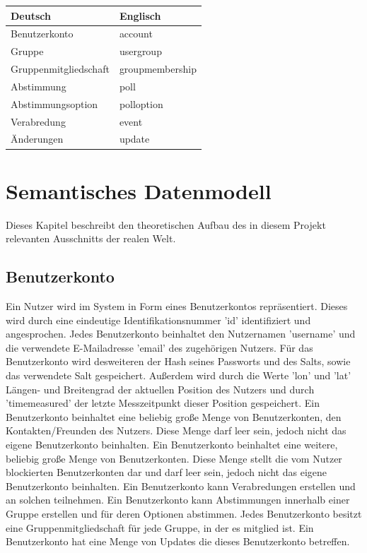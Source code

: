 \documentclass[parskip=full,11pt]{scrartcl}
\begin{document}
\begin{tabular}[t]{ l l }
    \textbf{Deutsch} & \textbf{Englisch}\\
    \hline
    Benutzerkonto & account\\
    Gruppe & usergroup\\
		Gruppenmitgliedschaft & groupmembership\\
		Abstimmung & poll\\
		Abstimmungsoption & polloption\\
		Verabredung & event\\
		Änderungen & update\\


\end{tabular}

\pagebreak

\section{Semantisches Datenmodell}
Dieses Kapitel beschreibt den theoretischen Aufbau des in diesem Projekt
relevanten Ausschnitts der realen Welt.

\subsection{Benutzerkonto}
Ein Nutzer wird im System in Form eines Benutzerkontos repräsentiert.
Dieses wird durch eine eindeutige Identifikationsnummer 'id' identifiziert und
angesprochen. Jedes Benutzerkonto beinhaltet den Nutzernamen 'username' und
die verwendete E-Mailadresse 'email' des zugehörigen Nutzers.
Für das Benutzerkonto wird desweiteren der Hash seines Passworts und des Salts,
sowie das verwendete Salt gespeichert.
Außerdem wird durch die Werte 'lon' und 'lat' Längen- und Breitengrad der
aktuellen Position des Nutzers und durch 'timemeasured' der letzte
Messzeitpunkt dieser Position gespeichert.
Ein Benutzerkonto beinhaltet eine beliebig große Menge von Benutzerkonten,
den Kontakten/Freunden des Nutzers. Diese Menge darf leer sein, jedoch nicht
das eigene Benutzerkonto beinhalten.
Ein Benutzerkonto beinhaltet eine weitere,
beliebig große Menge von Benutzerkonten.
Diese Menge stellt die vom Nutzer blockierten Benutzerkonten dar und darf leer
sein, jedoch nicht das eigene Benutzerkonto beinhalten. Ein Benutzerkonto kann
Verabredungen erstellen und an solchen teilnehmen.
Ein Benutzerkonto kann Abstimmungen innerhalb einer Gruppe erstellen und für
deren Optionen abstimmen.
Jedes Benutzerkonto besitzt eine Gruppenmitgliedschaft für jede Gruppe, in der
es mitglied ist.
Ein Benutzerkonto hat eine Menge von Updates die dieses Benutzerkonto
betreffen.
\end{document}
